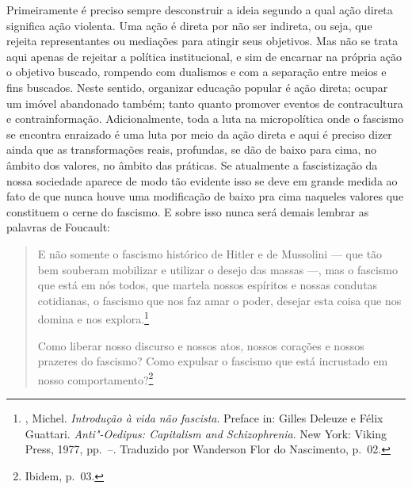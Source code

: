 Primeiramente é preciso sempre desconstruir a ideia segundo a qual ação
direta significa ação violenta. Uma ação é direta por não ser indireta,
ou seja, que rejeita representantes ou mediações para atingir seus
objetivos. Mas não se trata aqui apenas de rejeitar a política
institucional, e sim de encarnar na própria ação o objetivo buscado,
rompendo com dualismos e com a separação entre meios e fins buscados.
Neste sentido, organizar educação popular é ação direta; ocupar um
imóvel abandonado também; tanto quanto promover eventos de contracultura
e contrainformação. Adicionalmente, toda a luta na micropolítica onde o
fascismo se encontra enraizado é uma luta por meio da ação direta e aqui
é preciso dizer ainda que as transformações reais, profundas, se dão de
baixo para cima, no âmbito dos valores, no âmbito das práticas. Se
atualmente a fascistização da nossa sociedade aparece de modo tão
evidente isso se deve em grande medida ao fato de que nunca houve uma
modificação de baixo pra cima naqueles valores que constituem o cerne do
fascismo. E sobre isso nunca será demais lembrar as palavras de
Foucault:

\begin{quote}
E não somente o fascismo histórico de Hitler e de Mussolini --- que tão
bem souberam mobilizar e utilizar o desejo das massas ---, mas o fascismo
que está em nós todos, que martela nossos espíritos e nossas condutas
cotidianas, o fascismo que nos faz amar o poder, desejar esta coisa que
nos domina e nos explora.\footnote{, Michel. \emph{Introdução à
  vida não fascista}. Preface in: Gilles Deleuze e Félix Guattari.
  \emph{Anti"-Oedipus: Capitalism and Schizophrenia}. New York: Viking Press,
  1977, pp.~--. Traduzido por Wanderson Flor do Nascimento, p.~02.}

Como liberar nosso discurso e nossos atos, nossos corações e nossos
prazeres do fascismo? Como expulsar o fascismo que está incrustado em
nosso comportamento?\footnote{Ibidem, p.~03.}
\end{quote}

